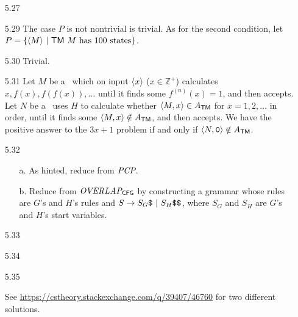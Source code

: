 \begin{itemize}
	\item[5.27]
	\Empty
	
	\item[\Star 5.28]
	\Omit
	
	\item[5.29]
	The case $P$ is not nontrivial is trivial. As for the second condition, let $P = \{ \Bra{M} \ | \ \TM\ M \text{ has $100$ states} \}$.
	
	\item[5.30]
	Trivial.
	
	\item[5.31]
	Let $M$ be a \TM\ which on input $\Bra{x}$ ($x \in \mathbb{Z}^+$) calculates $x, f(x), f(f(x)), \dots$ until it finds some $f^{(n)}(x)	= 1$, and then accepts. Let $N$ be a \TM\ uses $H$ to calculate whether $\Bra{M, x} \in A_{\TM}$ for $x = 1, 2, \dots$ in order, until it finds some $\Bra{M, x} \notin A_{\TM}$, and then accepts. We have the positive answer to the $3x + 1$ problem if and only if $\Bra{N, \TT{0}} \notin A_{\TM}$. 
	
	\item[5.32]
	\begin{itemize}
		\item[a.] As hinted, reduce from $\IT{PCP}$.
		\item[b.] Reduce from $\IT{OVERLAP}_{\CFG}$ by constructing a grammar whose rules are $G$'s and $H$'s rules and $S \to S_G \TT{\$} \ | \ S_H \TT{\$\$}$, where $S_G$ and $S_H$ are $G$'s and $H$'s start variables.
	\end{itemize}

	\item[5.33]
	\Empty
	
	\item[5.34]
	\Empty
	
	\item[5.35]
	\Empty
	
	\item[\Star 5.36]
	See \url{https://cstheory.stackexchange.com/q/39407/46760} for two different solutions.
	
\end{itemize}